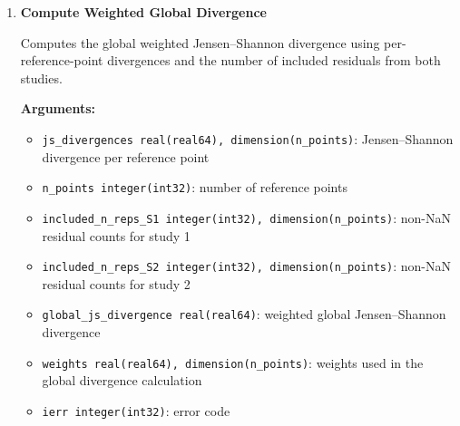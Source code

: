 \begin{enumerate}
        \textbf{Arguments:}
        \begin{itemize}
            \item \lstinline!pmf_S1 real(real64), dimension(n_points, n_bins)!: normalized histogram counts for study 1
            \item \lstinline!pmf_S2 real(real64), dimension(n_points, n_bins)!: normalized histogram counts for study 2
            \item \lstinline!n_points integer(int32)!: number of reference points
            \item \lstinline!n_bins integer(int32)!: number of histogram bins in \([-R, R]\)
            \item \lstinline!js_divergences real(real64), dimension(n_points)!: Jensen–Shannon divergence per reference point
            \item \lstinline!ierr integer(int32)!: error code
        \end{itemize}

        \begin{lstlisting}[caption={Per-Reference-Point Divergence}]
call compute_divergence_per_reference_point(pmf_S1, pmf_S2, n_points, n_bins, js_divergences, ierr)
        \end{lstlisting}

    \item \textbf{Compute Weighted Global Divergence}

        Computes the global weighted Jensen–Shannon divergence using per-reference-point divergences and the number of included residuals from both studies.

        \textbf{Arguments:}
        \begin{itemize}
            \item \lstinline!js_divergences real(real64), dimension(n_points)!: Jensen–Shannon divergence per reference point
            \item \lstinline!n_points integer(int32)!: number of reference points
            \item \lstinline!included_n_reps_S1 integer(int32), dimension(n_points)!: non-NaN residual counts for study 1
            \item \lstinline!included_n_reps_S2 integer(int32), dimension(n_points)!: non-NaN residual counts for study 2
            \item \lstinline!global_js_divergence real(real64)!: weighted global Jensen–Shannon divergence
            \item \lstinline!weights real(real64), dimension(n_points)!: weights used in the global divergence calculation
            \item \lstinline!ierr integer(int32)!: error code
        \end{itemize}


\end{enumerate}
